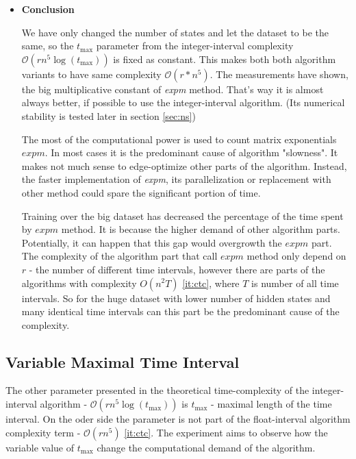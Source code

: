 \documentclass[thesis=M,english]{FITthesis}[2012/10/20]
\begin{document}
\begin{itemize}
\item \textbf{ Conclusion }

We have only changed the number of states and let the dataset to be the same, so the $t_{\max}$ parameter from the integer-interval complexity $\mathcal{O}(r n^5 \log(t_{\max}))$ is fixed as constant. This makes both both algorithm variants to have same complexity $\mathcal{O}(r*n^5)$. The measurements have shown, the big multiplicative constant of \textit{expm} method. That's way it is almost always better, if possible to use the integer-interval algorithm. (Its numerical stability is tested later in section \ref{sec:ns}) 

The most of the computational power is used to count matrix exponentials $expm$. In most cases it is the predominant cause of algorithm "slowness". It makes not much sense to edge-optimize other parts of the algorithm. Instead, the faster implementation of \textit{expm}, its parallelization or replacement with other method could spare the significant portion of time.      

Training over the big dataset \label{fig:e2big} has decreased the percentage of the time spent by $expm$ method. It is because the higher demand of other algorithm parts. Potentially, it can happen that this gap would overgrowth the $expm$ part. The complexity of the algorithm part that call $expm$ method only depend on $r$ - the number of different time intervals, however there are parts of the algorithms with complexity ${O}(n^2T)$ \ref{it:ctc}, where $T$ is number of all time intervals. So for the huge dataset with lower number of hidden states and many identical time intervals can this part be the predominant cause of the complexity.   

\end{itemize}

\subsection{Variable Maximal Time Interval}

The other parameter presented in the theoretical time-complexity of the integer-interval algorithm - $\mathcal{O}(r n^5 \log(t_{\max}))$ is $t_{\max}$ - maximal length of the time interval. On the oder side the parameter is not part of the float-interval algorithm complexity term - $\mathcal{O}(r n^5)$ \ref{it:ctc}. The experiment aims to observe how the variable value of $t_{\max}$ change the computational demand of the algorithm.  
\end{document}
